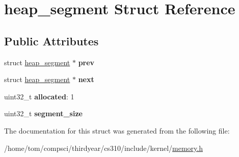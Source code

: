 \hypertarget{structheap__segment}{}\section{heap\+\_\+segment Struct Reference}
\label{structheap__segment}
\subsection*{Public Attributes}
\begin{DoxyCompactItemize}
\item 
\mbox{\label{structheap__segment_a0bda39ceef1009de6351fc1105a1ad0b}} 
struct \mbox{\hyperlink{structheap__segment}{heap\+\_\+segment}} $\ast$ {\bfseries prev}
\item 
\mbox{\label{structheap__segment_a515d4a114ec40fe1580ab858bfa3279d}} 
struct \mbox{\hyperlink{structheap__segment}{heap\+\_\+segment}} $\ast$ {\bfseries next}
\item 
\mbox{\label{structheap__segment_a909538cb3b44a56a4e902222ac54ff62}} 
uint32\+\_\+t {\bfseries allocated}\+: 1
\item 
\mbox{\label{structheap__segment_ab66640620b3a010c148f5e703e5ce330}} 
uint32\+\_\+t {\bfseries segment\+\_\+size}
\end{DoxyCompactItemize}


The documentation for this struct was generated from the following file\+:\begin{DoxyCompactItemize}
\item 
/home/tom/compsci/thirdyear/cs310/include/kernel/\mbox{\hyperlink{memory_8h}{memory.\+h}}\end{DoxyCompactItemize}
